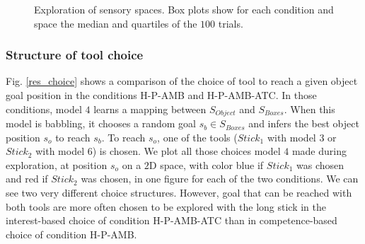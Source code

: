\documentclass[10pt,letterpaper]{article}
\begin{document}
\begin{figure}[ht]
			\caption{Exploration of sensory spaces. Box plots show for each condition and space the median and quartiles of the $100$ trials.}
			\label{res_explo}
		\end{figure}

	
	\subsubsection{Structure of tool choice}

		Fig. \ref{res_choice} shows a comparison of the choice of tool to reach a given object goal position in the conditions H-P-AMB and H-P-AMB-ATC.
		In those conditions, model $4$ learns a mapping between $S_{Object}$ and $S_{Boxes}$. 
		When this model is babbling, it chooses a random goal $s_b \in S_{Boxes}$ and infers the best object position $s_o$ to reach $s_b$.
		To reach $s_o$, one of the tools ($Stick_1$ with model $3$ or $Stick_2$ with model $6$) is chosen. 
		We plot all those choices model $4$ made during exploration, at position $s_o$ on a $2$D space, with color blue if $Stick_1$ was chosen and red if $Stick_2$ was chosen, in one figure for each of the two conditions.
		We can see two very different choice structures.
		However, goal that can be reached with both tools are more often chosen to be explored with the long stick in the interest-based choice of condition H-P-AMB-ATC than in competence-based choice of condition H-P-AMB.
		
\end{document}
